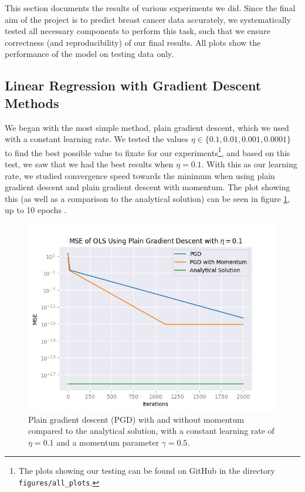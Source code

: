 This section documents the results of various experiments we did. Since the final aim of the
project is to predict breast cancer data accurately, we systematically tested all necessary components to perform this task, such that we ensure correctness (and reproducibility) of our final results. All plots show the performance of the model on testing data only.

\subsection{Linear Regression with Gradient Descent Methods}
We began with the most simple method, plain gradient descent, which we used with a constant learning rate. We tested the values $\eta \in \{ 0.1, 0.01, 0.001, 0.0001\}$ to find the best possible value to fixate for our experiments\footnote{The plots showing our testing can be found on GitHub in the directory \texttt{figures/all\_plots}.}, and based on this test, we saw that we had the best results when $\eta = 0.1$. With this as our learning rate, we studied convergence speed towards the minimum when using plain gradient descent and plain gradient descent with momentum. The plot showing this (as well as a comparison to the analytical solution) can be seen in figure \ref{fig:plainVSanalytical}, up to 10 epochs \cite{mediumEpochNumber}\cite{epochsBreastCancerArticle}.
\begin{figure}
    \centering
    \includegraphics[width=\linewidth]{figures/all_plots/plain_mse_pr_iter_eta_1e-1.png}
    \caption{Plain gradient descent (PGD) with and without momentum compared to the analytical solution, with a constant learning rate of $\eta = 0.1$ and a momentum parameter $\gamma = 0.5$.}
    \label{fig:plainVSanalytical}
\end{figure}

